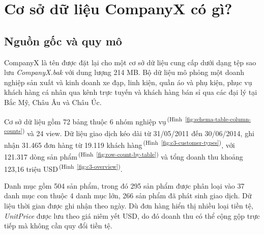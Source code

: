 \documentclass[a4paper,12pt]{article}
\numberwithin{figure}{section}
\numberwithin{table}{section}
\newcommand{\nguon}[1]{\textsuperscript{\,(Hình~\ref{#1})}}
\begin{document}
\tableofcontents
\newpage


\section{Cơ sở dữ liệu CompanyX có gì?}
\label{sec:overview}


\subsection{Nguồn gốc và quy mô}
\label{sec:c1-origin}
CompanyX là tên được đặt lại cho một cơ sở dữ liệu cung cấp dưới dạng tệp sao lưu \textit{CompanyX.bak} với dung lượng 214 MB. Bộ dữ liệu mô phỏng một doanh nghiệp sản xuất và kinh doanh xe đạp, linh kiện, quần áo và phụ kiện, phục vụ khách hàng cá nhân qua kênh trực tuyến và khách hàng bán sỉ qua các đại lý tại Bắc Mỹ, Châu Âu và Châu Úc.

Cơ sở dữ liệu gồm 72 bảng thuộc 6 nhóm nghiệp vụ\nguon{fig:schema-table-column-counts} và 24 view. Dữ liệu giao dịch kéo dài từ 31/05/2011 đến 30/06/2014, ghi nhận 31.465 đơn hàng từ 19.119 khách hàng\nguon{fig:c3-customer-types}, với 121.317 dòng sản phẩm\nguon{fig:row-count-by-table} và tổng doanh thu khoảng 123,16 triệu USD\nguon{fig:c3-overview}.

Danh mục gồm 504 sản phẩm, trong đó 295 sản phẩm được phân loại vào 37 danh mục con thuộc 4 danh mục lớn, 266 sản phẩm đã phát sinh giao dịch. Dữ liệu thời gian được ghi nhận theo ngày. Dù đơn hàng hiển thị nhiều loại tiền tệ, \textit{UnitPrice} được lưu theo giá niêm yết USD, do đó doanh thu có thể cộng gộp trực tiếp mà không cần quy đổi tiền tệ.
\end{document}
